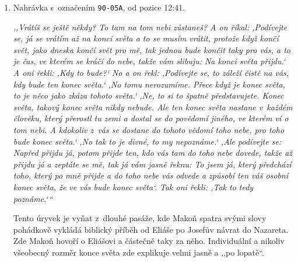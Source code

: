 \begin{enumerate}

\item{
Nahrávka s~označením \texttt{90-05A}, od pozice 12:41.

\textit{%
,,Vrátíš se ještě někdy? To tam na tom nebi zůstaneš? A on říkal: ,Podívejte se,
já se vrátím až na konci světa a to se musím vrátit, protože když končí svět,
jako dneska končí svět pro mě, tak jednou bude končit taky pro vás, a to je čas,
ve kterém se kráčí do nebe, takže vám slibuju: Na konci světa přijdu.` A oni
řekli: ,Kdy to bude?{}` No a on řekl: ,Podívejte se, to záleží čistě na vás, kdy
bude ten konec světa.` ,No tomu nerozumíme. Přece když je konec světa, to je
něco jako zkáza tohoto světa.` ,Ne, to si to špatně představujete. Konec světa,
takový konec světa nikdy nebude. Ale ten konec světa nastane v~každém člověku,
který přerostl tu zemi a dostal se do povědomí jiného, ve kterém ví o tom nebi.
A kdokoliv z~vás se dostane do tohoto vědomí toho nebe, pro toho bude konec
světa.` ,No tak to je divné, to my nepoznáme.` ,Ale podívejte se: Napřed přijdu
já, potom přijde ten, kdo vás tam do toho nebe dovede, takže až přijdu já a
zeptáte se mě, tak já vám jasně řeknu: \guillemotright{}To jsem já, který
předchází toho, který po mně přijde a do toho nebe vás odvede a způsobí ten váš
osobní konec světa, že ve vás bude konec světa\guillemotleft{}`. Tak oni řekli:
,Tak to tedy poznáme.`{}``
}

Tento úryvek je vyňat z~dlouhé pasáže, kde Makoň spatra svými slovy pohádkově
        vykládá biblický příběh od Eliáše po Josefův návrat do Nazareta. Zde
        Makoň hovoří o Eliášovi a částečně taky za něho.
Individuální a nikoliv všeobecný rozměr konce světa zde explikuje velmi jasně a
,,po lopatě``.

}



\end{enumerate}
